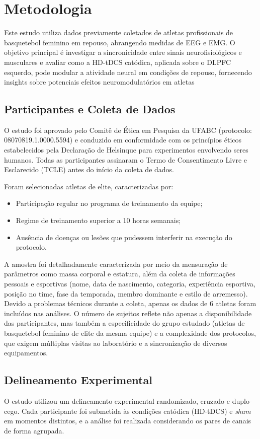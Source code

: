 \chapter{Metodologia}
\label{chap:metodologia}
Este estudo utiliza dados previamente coletados de atletas profissionais de basquetebol feminino em repouso, abrangendo medidas de EEG e EMG. O objetivo principal é investigar a sincronicidade entre sinais neurofisiológicos e musculares e avaliar como a HD-tDCS catódica, aplicada sobre o DLPFC esquerdo, pode modular a atividade neural em condições de repouso, fornecendo insights sobre potenciais efeitos neuromodulatórios em atletas

\section{Participantes e Coleta de Dados}
O estudo foi aprovado pelo Comitê de Ética em Pesquisa da UFABC (protocolo: 08070819.1.0000.5594) e conduzido em conformidade com os princípios éticos estabelecidos pela Declaração de Helsinque para experimentos envolvendo seres humanos. Todas as participantes assinaram o Termo de Consentimento Livre e Esclarecido (TCLE) antes do início da coleta de dados.

Foram selecionadas atletas de elite, caracterizadas por:
\begin{itemize}
    \item Participação regular no programa de treinamento da equipe;
    \item Regime de treinamento superior a 10 horas semanais;
    \item Ausência de doenças ou lesões que pudessem interferir na execução do protocolo.
\end{itemize}

A amostra foi detalhadamente caracterizada por meio da mensuração de parâmetros como massa corporal e estatura, além da coleta de informações pessoais e esportivas (nome, data de nascimento, categoria, experiência esportiva, posição no time, fase da temporada, membro dominante e estilo de arremesso). Devido a problemas técnicos durante a coleta, apenas os dados de 6 atletas foram incluídos nas análises. O número de sujeitos reflete não apenas a disponibilidade das participantes, mas também a especificidade do grupo estudado (atletas de basquetebol feminino de elite da mesma equipe) e a complexidade dos protocolos, que exigem múltiplas visitas ao laboratório e a sincronização de diversos equipamentos.

\section{Delineamento Experimental}
O estudo utilizou um delineamento experimental randomizado, cruzado e duplo-cego. Cada participante foi submetida às condições catódica (HD-tDCS) e \textit{sham} em momentos distintos, e a análise foi realizada considerando os pares de canais de forma agrupada.

